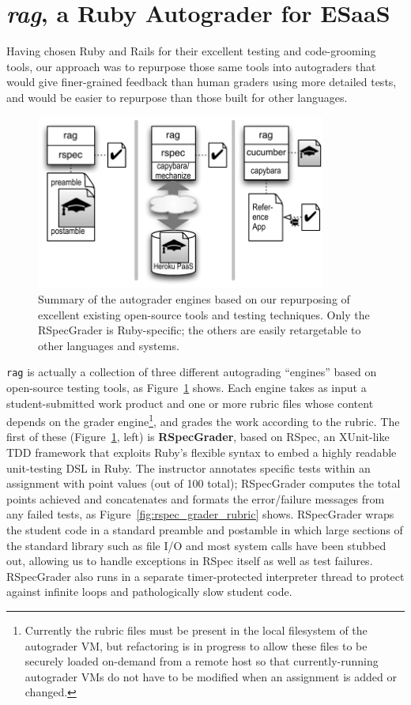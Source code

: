\section{\emph{rag}, a Ruby Autograder for ESaaS}

Having chosen Ruby and Rails for their excellent testing and
code-grooming tools, our approach was to repurpose those same tools into
autograders that would give finer-grained feedback than human graders
using more detailed tests, and would be easier to repurpose than
those built for other languages.

\begin{figure}
  \centering
  \includegraphics[width=0.85\textwidth]{figs/rag.pdf}
  
  \caption{\label{fig:grader_summary} Summary of the autograder
    engines based on our repurposing of excellent existing open-source
    tools and testing techniques.  Only the RSpecGrader is
    Ruby-specific; the others are easily retargetable to other languages
    and systems.}
\end{figure}

\texttt{rag} is actually a collection of
three different autograding ``engines'' based on open-source testing
tools, as Figure~\ref{fig:grader_summary} shows.
Each engine takes as input a student-submitted work product and one or
more rubric files whose content depends on the grader
engine\footnote{Currently the rubric files must be present in the local
filesystem of the autograder VM, but refactoring is in progress to
allow these files to be securely loaded on-demand from a remote host
so that currently-running autograder VMs do not have to be modified
when an assignment is added or changed.}, and grades the work
according to the rubric.
The first of these (Figure~\ref{fig:grader_summary}, left) is
\textbf{RSpecGrader}, based on RSpec, an XUnit-like TDD framework that
exploits Ruby's flexible syntax to embed a highly readable unit-testing
DSL in Ruby.
The instructor annotates specific tests within an assignment with point
values (out of 100 total); RSpecGrader computes the total points
achieved and concatenates and formats the error/failure messages from
any failed tests, as Figure~\ref{fig:rspec_grader_rubric} shows.
RSpecGrader wraps the student code in a standard preamble and postamble
in which large sections of the standard library such as file I/O and
most system calls have been stubbed out, allowing us to handle
exceptions in RSpec itself as well as test failures.
RSpecGrader also runs in a separate timer-protected interpreter thread
to protect against infinite loops and pathologically slow student code.

